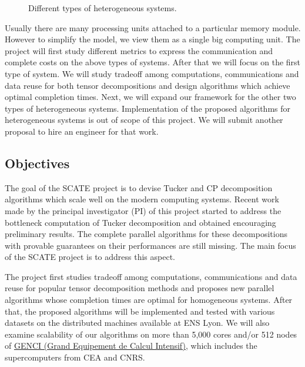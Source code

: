 \documentclass[a4paper,11pt]{article}
\newcommand{\sk}[1]{{\color{blue} \emph{#1}}}
\begin{document}
\begin{figure}[htb]
\begin{center}
{}
			\vspace*{-0.05cm}\caption{Different types of heterogeneous systems.\label{fig:heterogeneousSystems}}
		\end{center}\vspace*{-0.25cm}		
	\end{figure}
	
	Usually there are many processing units attached to a particular memory module. However to simplify the model, we view them as a single big computing unit.
	The project will first study different metrics to express the communication and complete costs on the above types of systems. After that we will focus on the first type of system. We will study tradeoff among computations, communications and data reuse for both tensor decompositions and design algorithms which achieve optimal completion times. Next, we will expand our framework for the other two types of heterogeneous systems. Implementation of the proposed algorithms for heterogeneous systems is out of scope of this project. We will submit another proposal to hire an engineer for that work.
	
	\subsection{Objectives}
	\label{sec:context:obj}
	
	The goal of the SCATE project is to devise Tucker and CP decomposition algorithms which scale well on the modern computing systems. Recent work~\cite{ABGKR-SIMAX-2024} made by the principal investigator (PI) of this project started to address the bottleneck computation of Tucker decomposition and obtained encouraging preliminary results. The complete parallel algorithms for these decompositions with provable guarantees on their performances are still missing. The main focus of the SCATE project is to address this aspect.
	
	
	The project first studies tradeoff among computations, communications and data reuse for popular tensor decomposition methods and proposes new parallel algorithms whose completion times are optimal for homogeneous systems. After that, the proposed algorithms will be implemented and tested with various datasets on the distributed machines available at ENS Lyon. We will also examine scalability of our algorithms on more than 5,000 cores and/or 512 nodes of \href{https://www.genci.fr/en/our-computers}{GENCI (Grand Equipement de Calcul Intensif)}, which includes the supercomputers from CEA and CNRS.
\end{document}
